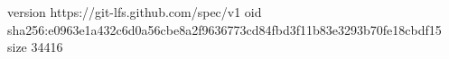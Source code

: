 version https://git-lfs.github.com/spec/v1
oid sha256:e0963e1a432c6d0a56cbe8a2f9636773cd84fbd3f11b83e3293b70fe18cbdf15
size 34416
